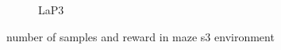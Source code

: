 \documentclass[bibliography=totoc]{scrartcl}
\begin{document}
\begin{figure}[H]
\begin{subfigure}[b]{0.3\linewidth}
        \caption{LaP3}
	\end{subfigure}
	\caption{number of samples and reward in maze s3 environment}
	\label{fig:SampleRewardMazeDifferentSpaceComplexityAlgo}
\end{figure}

\end{document}
